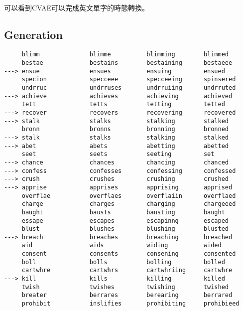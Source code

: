 \paragraph{}
可以看到CVAE可以完成英文單字的時態轉換。
\subsection{Generation}
\begin{lstlisting}
     blimm          	blimme         	blimming       	blimmed        	
     bestae         	bestains       	bestaining     	bestaeee       	
---> ensue          	ensues         	ensuing        	ensued         	
     specion        	specceee       	specceeing     	spinsered      	
     undrruc        	undrruses      	undrruiing     	undrruted      	
---> achieve        	achieves       	achieving      	achieved       	
     tett           	tetts          	tetting        	tetted         	
---> recover        	recovers       	recovering     	recovered      	
---> stalk          	stalks         	stalking       	stalked        	
     bronn          	bronns         	bronning       	bronned        	
---> stalk          	stalks         	stalking       	stalked        	
---> abet           	abets          	abetting       	abetted        	
     seet           	seets          	seeting        	set            	
---> chance         	chances        	chancing       	chanced        	
---> confess        	confesses      	confessing     	confessed      	
---> crush          	crushes        	crushing       	crushed        	
---> apprise        	apprises       	apprising      	apprised       	
     overflae       	overflaes      	overflaiin     	overflaed      	
     charge         	charges        	charging       	chargeeed      	
     baught         	bausts         	bausting       	baught         	
     essape         	escapes        	escapinng      	escaped        	
     blust          	blushes        	blushing       	blusted        	
---> breach         	breaches       	breaching      	breached       	
     wid            	wids           	widing         	wided          	
     consent        	consents       	consening      	consented      	
     boll           	bolls          	bolling        	bolled         	
     cartwhre       	cartwhrs       	cartwhriing    	cartwhre       	
---> kill           	kills          	killing        	killed         	
     twish          	twishes        	twishing       	twished        	
     breater        	berrares       	berearing      	berrared       	
     prohibit       	inslifies      	prohibiting    	prohibieed     	

\end{lstlisting}
